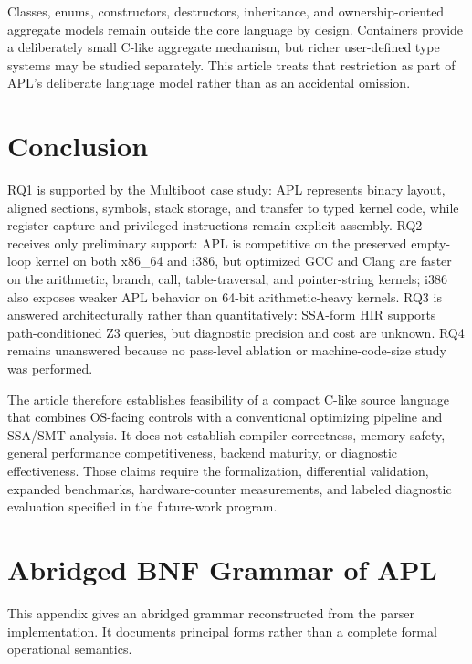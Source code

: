 \documentclass[10pt,twocolumn]{article}
\begin{document}
\par Classes, enums, constructors, destructors, inheritance, and ownership-oriented aggregate models remain outside the core language by design. Containers provide a deliberately small C-like aggregate mechanism, but richer user-defined type systems may be studied separately. This article treats that restriction as part of APL's deliberate language model rather than as an accidental omission.

\section{Conclusion}

\par RQ1 is supported by the Multiboot case study: APL represents binary layout, aligned sections, symbols, stack storage, and transfer to typed kernel code, while register capture and privileged instructions remain explicit assembly. RQ2 receives only preliminary support: APL is competitive on the preserved empty-loop kernel on both x86\_64 and i386, but optimized GCC and Clang are faster on the arithmetic, branch, call, table-traversal, and pointer-string kernels; i386 also exposes weaker APL behavior on 64-bit arithmetic-heavy kernels. RQ3 is answered architecturally rather than quantitatively: SSA-form HIR supports path-conditioned Z3 queries, but diagnostic precision and cost are unknown. RQ4 remains unanswered because no pass-level ablation or machine-code-size study was performed.

\par The article therefore establishes feasibility of a compact C-like source language that combines OS-facing controls with a conventional optimizing pipeline and SSA/SMT analysis. It does not establish compiler correctness, memory safety, general performance competitiveness, backend maturity, or diagnostic effectiveness. Those claims require the formalization, differential validation, expanded benchmarks, hardware-counter measurements, and labeled diagnostic evaluation specified in the future-work program.

\appendix

\section{Abridged BNF Grammar of APL}
\label{app:apl-bnf}

\par This appendix gives an abridged grammar reconstructed from the parser implementation. It documents principal forms rather than a complete formal operational semantics.
\end{document}
